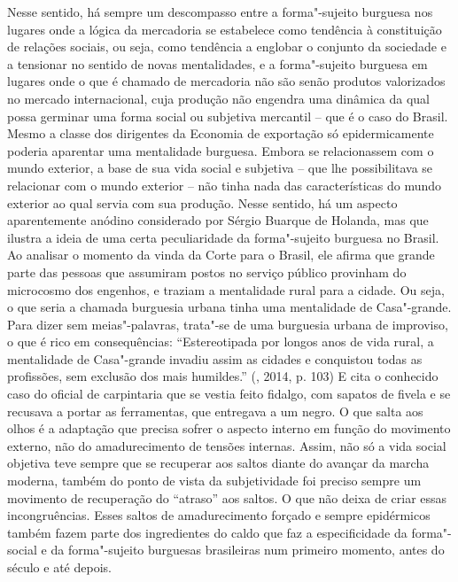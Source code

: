 Nesse sentido, há sempre um descompasso entre a forma"-sujeito burguesa
nos lugares onde a lógica da mercadoria se estabelece como tendência à
constituição de relações sociais, ou seja, como tendência a englobar o
conjunto da sociedade e a tensionar no sentido de novas mentalidades, e
a forma"-sujeito burguesa em lugares onde o que é chamado de mercadoria
não são senão produtos valorizados no mercado internacional, cuja
produção não engendra uma dinâmica da qual possa germinar uma forma
social ou subjetiva mercantil -- que é o caso do Brasil. Mesmo a classe
dos dirigentes da Economia de exportação só epidermicamente poderia
aparentar uma mentalidade burguesa. Embora se relacionassem com o mundo
exterior, a base de sua vida social e subjetiva -- que lhe possibilitava
se relacionar com o mundo exterior -- não tinha nada das características
do mundo exterior ao qual servia com sua produção. Nesse sentido, há um
aspecto aparentemente anódino considerado por Sérgio Buarque de Holanda,
mas que ilustra a ideia de uma certa peculiaridade da forma"-sujeito
burguesa no Brasil. Ao analisar o momento da vinda da Corte para o
Brasil, ele afirma que grande parte das pessoas que assumiram postos no
serviço público provinham do microcosmo dos engenhos, e traziam a
mentalidade rural para a cidade. Ou seja, o que seria a chamada
burguesia urbana tinha uma mentalidade de Casa"-grande. Para dizer sem
meias"-palavras, trata"-se de uma burguesia urbana de improviso, o que é
rico em consequências: ``Estereotipada por longos anos de vida rural, a
mentalidade de Casa"-grande invadiu assim as cidades e conquistou todas
as profissões, sem exclusão dos mais humildes.'' (, 2014, p. 103)
E cita o conhecido caso do oficial de carpintaria que se vestia feito
fidalgo, com sapatos de fivela e se recusava a portar as ferramentas,
que entregava a um negro. O que salta aos olhos é a adaptação que
precisa sofrer o aspecto interno em função do movimento externo, não do
amadurecimento de tensões internas. Assim, não só a vida social objetiva
teve sempre que se recuperar aos saltos diante do avançar da marcha
moderna, também do ponto de vista da subjetividade foi preciso sempre um
movimento de recuperação do ``atraso'' aos saltos. O que não deixa de
criar essas incongruências. Esses saltos de amadurecimento forçado e
sempre epidérmicos também fazem parte dos ingredientes do caldo que faz
a especificidade da forma"-social e da forma"-sujeito burguesas
brasileiras num primeiro momento, antes do século  e até depois.

